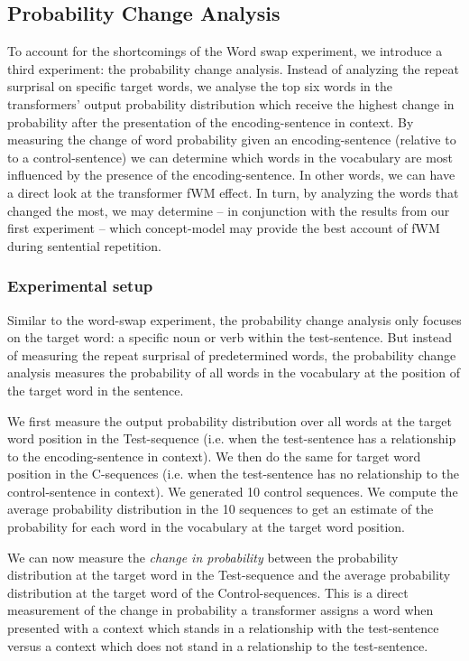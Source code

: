 \subsection{Probability Change Analysis}\label{ex:3_prob_change_analysis}

To account for the shortcomings of the Word swap experiment, we introduce a third experiment: the probability change analysis.
Instead of analyzing the repeat surprisal on specific target words, we analyse the top six words in the transformers' output probability distribution which receive the highest change in probability after the presentation of the encoding-sentence in context.
By measuring the change of word probability given an encoding-sentence (relative to to a control-sentence) we can determine which words in the vocabulary are most influenced by the presence of the encoding-sentence.
In other words, we can have a direct look at the transformer fWM effect.
In turn, by analyzing the words that changed the most, we may determine -- in conjunction with the results from our first experiment -- which concept-model may provide the best account of fWM during sentential repetition.


\subsubsection{Experimental setup}
Similar to the word-swap experiment, the probability change analysis only focuses on the target word: a specific noun or verb within the test-sentence.
But instead of measuring the repeat surprisal of predetermined words, the probability change analysis measures the probability of all words in the vocabulary at the position of the target word in the sentence.

We first measure the output probability distribution over all words at the target word position in the Test-sequence (i.e. when the test-sentence has a relationship to the encoding-sentence in context).
We then do the same for target word position in the C-sequences (i.e. when the test-sentence has no relationship to the control-sentence in context).
We generated 10 control sequences.
We compute the average probability distribution in the 10 sequences to get an estimate of the probability for each word in the vocabulary at the target word position.

We can now measure the \textit{change in probability} between the probability distribution at the target word in the Test-sequence and the average probability distribution at the target word of the Control-sequences.
This is a direct measurement of the change in probability a transformer assigns a word when presented with a context which stands in a relationship with the test-sentence versus a context which does not stand in a relationship to the test-sentence.

